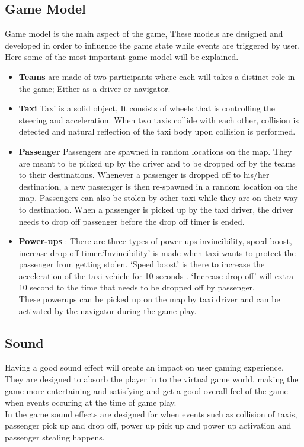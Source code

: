 \subsection*{Game Model}
	Game model is the main aspect of the game, These models are designed and developed in order to influence the game state while events are triggered by user.  Here some of the most important game model will be explained.

\begin{itemize}
	
	\item \textbf{Teams} are made of two participants where each will takes a distinct role in the game; Either as a driver or navigator.
	\item \textbf{Taxi} Taxi is a solid object, It consists of wheels that is controlling the steering and acceleration. When two taxis collide with each other, collision is detected and natural reflection of the taxi body upon collision is performed.  	
	\item \textbf{Passenger} Passengers are spawned in random locations on the map. They are meant to be picked up by the driver and to be dropped off by the teams to their destinations. Whenever a passenger is dropped off to his/her destination, a new passenger is then re-spawned in a random location on the map. Passengers can also be stolen by other taxi while they are on their way to destination. When a passenger is picked up by the taxi driver, the driver needs to drop off passenger before the drop off timer is ended.
			
	\item \textbf{Power-ups} : There are three types of power-ups invincibility, speed boost, increase drop off timer.`Invincibility' is made when taxi wants to protect the passenger from getting stolen. `Speed boost' is there to increase the acceleration of the taxi vehicle for 10 seconds . `Increase drop off' will extra 10 second to the time that needs to be dropped off by passenger.\\
	These powerups can be picked up on the map by taxi driver and can be activated by the navigator during the game play.   
\end{itemize}	

\subsection*{Sound}
	Having a good sound effect will create an impact on user gaming experience. They are designed to absorb the player in to the virtual game world, making the game more entertaining and satisfying and get a good overall feel of the game when events occuring at the time of game play.\\
	In the game sound effects are designed for when events such as collision of taxis, passenger pick up and drop off, power up pick up and power up activation and passenger stealing happens.


